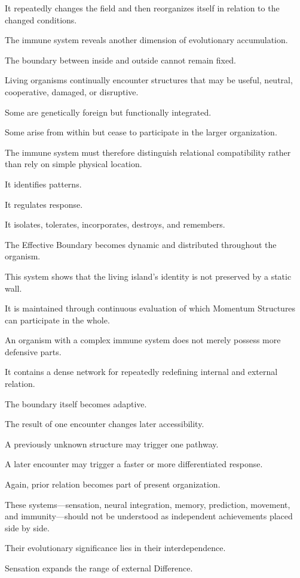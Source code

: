 It repeatedly changes the field and then reorganizes itself in relation to the changed conditions.

The immune system reveals another dimension of evolutionary accumulation.

The boundary between inside and outside cannot remain fixed.

Living organisms continually encounter structures that may be useful, neutral, cooperative, damaged, or disruptive.

Some are genetically foreign but functionally integrated.

Some arise from within but cease to participate in the larger organization.

The immune system must therefore distinguish relational compatibility rather than rely on simple physical location.

It identifies patterns.

It regulates response.

It isolates, tolerates, incorporates, destroys, and remembers.

The Effective Boundary becomes dynamic and distributed throughout the organism.

This system shows that the living island’s identity is not preserved by a static wall.

It is maintained through continuous evaluation of which Momentum Structures can participate in the whole.

An organism with a complex immune system does not merely possess more defensive parts.

It contains a dense network for repeatedly redefining internal and external relation.

The boundary itself becomes adaptive.

The result of one encounter changes later accessibility.

A previously unknown structure may trigger one pathway.

A later encounter may trigger a faster or more differentiated response.

Again, prior relation becomes part of present organization.

These systems—sensation, neural integration, memory, prediction, movement, and immunity—should not be understood as independent achievements placed side by side.

Their evolutionary significance lies in their interdependence.

Sensation expands the range of external Difference.

